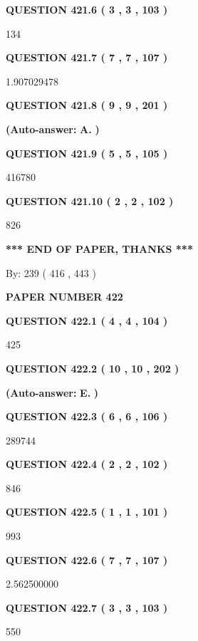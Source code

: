 \documentclass{ctexart}
\begin{document}
  
{\textbf{\large{QUESTION
421.6 
 ( 3 , 3 , 103 )
}}}

134
  
  
{\textbf{\large{QUESTION
421.7 
 ( 7 , 7 , 107 )
}}}

1.907029478
  
  
{\textbf{\large{QUESTION
421.8 
 ( 9 , 9 , 201 )
}}}
 
 
{\textbf{(Auto-answer:}}
{\textbf{\large{
A.}}}
{\textbf{)}}
 
 
  
  
{\textbf{\large{QUESTION
421.9 
 ( 5 , 5 , 105 )
}}}

416780
  
  
{\textbf{\large{QUESTION
421.10 
 ( 2 , 2 , 102 )
}}}

826
   
   
   
   
\vspace{1.0in} 
{\textbf{\large{ *** END OF PAPER, THANKS *** }}} 
   
   
\hspace{1.0in} By: 
 239 ( 416 ,  443 )
   
   
   
   
\newpage 
\setcounter{page}{ 
   422001 } 
   
   
 {\textbf{ \Large{ PAPER NUMBER  422  }}}
   
   
   
   
  
  
{\textbf{\large{QUESTION
422.1 
 ( 4 , 4 , 104 )
}}}

425
  
  
{\textbf{\large{QUESTION
422.2 
 ( 10 , 10 , 202 )
}}}
 
 
{\textbf{(Auto-answer:}}
{\textbf{\large{
E.}}}
{\textbf{)}}
 
 
  
  
{\textbf{\large{QUESTION
422.3 
 ( 6 , 6 , 106 )
}}}

289744
  
  
{\textbf{\large{QUESTION
422.4 
 ( 2 , 2 , 102 )
}}}

846
  
  
{\textbf{\large{QUESTION
422.5 
 ( 1 , 1 , 101 )
}}}

993
  
  
{\textbf{\large{QUESTION
422.6 
 ( 7 , 7 , 107 )
}}}

2.562500000
  
  
{\textbf{\large{QUESTION
422.7 
 ( 3 , 3 , 103 )
}}}

550
  
\end{document}
